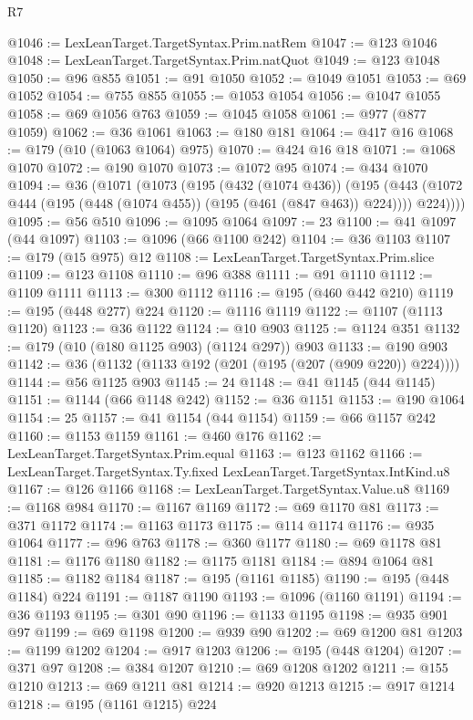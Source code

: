 \begin{lexlean}{R7}
\begin{coremodule}
@1046 := LexLeanTarget.TargetSyntax.Prim.natRem
@1047 := @123 @1046
@1048 := LexLeanTarget.TargetSyntax.Prim.natQuot
@1049 := @123 @1048
@1050 := @96 @855
@1051 := @91 @1050
@1052 := @1049 @1051
@1053 := @69 @1052
@1054 := @755 @855
@1055 := @1053 @1054
@1056 := @1047 @1055
@1058 := @69 @1056 @763
@1059 := @1045 @1058
@1061 := @977 (@877 @1059)
@1062 := @36 @1061
@1063 := @180 @181
@1064 := @417 @16
@1068 := @179 (@10 (@1063 @1064) @975)
@1070 := @424 @16 @18
@1071 := @1068 @1070
@1072 := @190 @1070
@1073 := @1072 @95
@1074 := @434 @1070
@1094 := @36
    (@1071
      (@1073
        (@195
          (@432 (@1074 @436))
          (@195
            (@443 (@1072 @444 (@195 (@448 (@1074 @455)) (@195 (@461 (@847 @463)) @224))))
            @224))))
@1095 := @56 @510
@1096 := @1095 @1064
@1097 := 23
@1100 := @41 @1097 (@44 @1097)
@1103 := @1096 (@66 @1100 @242)
@1104 := @36 @1103
@1107 := @179 (@15 @975) @12
@1108 := LexLeanTarget.TargetSyntax.Prim.slice
@1109 := @123 @1108
@1110 := @96 @388
@1111 := @91 @1110
@1112 := @1109 @1111
@1113 := @300 @1112
@1116 := @195 (@460 @442 @210)
@1119 := @195 (@448 @277) @224
@1120 := @1116 @1119
@1122 := @1107 (@1113 @1120)
@1123 := @36 @1122
@1124 := @10 @903
@1125 := @1124 @351
@1132 := @179 (@10 (@180 @1125 @903) (@1124 @297)) @903
@1133 := @190 @903
@1142 := @36 (@1132 (@1133 @192 (@201 (@195 (@207 (@909 @220)) @224))))
@1144 := @56 @1125 @903
@1145 := 24
@1148 := @41 @1145 (@44 @1145)
@1151 := @1144 (@66 @1148 @242)
@1152 := @36 @1151
@1153 := @190 @1064
@1154 := 25
@1157 := @41 @1154 (@44 @1154)
@1159 := @66 @1157 @242
@1160 := @1153 @1159
@1161 := @460 @176
@1162 := LexLeanTarget.TargetSyntax.Prim.equal
@1163 := @123 @1162
@1166 := LexLeanTarget.TargetSyntax.Ty.fixed LexLeanTarget.TargetSyntax.IntKind.u8
@1167 := @126 @1166
@1168 := LexLeanTarget.TargetSyntax.Value.u8
@1169 := @1168 @984
@1170 := @1167 @1169
@1172 := @69 @1170 @81
@1173 := @371 @1172
@1174 := @1163 @1173
@1175 := @114 @1174
@1176 := @935 @1064
@1177 := @96 @763
@1178 := @360 @1177
@1180 := @69 @1178 @81
@1181 := @1176 @1180
@1182 := @1175 @1181
@1184 := @894 @1064 @81
@1185 := @1182 @1184
@1187 := @195 (@1161 @1185)
@1190 := @195 (@448 @1184) @224
@1191 := @1187 @1190
@1193 := @1096 (@1160 @1191)
@1194 := @36 @1193
@1195 := @301 @90
@1196 := @1133 @1195
@1198 := @935 @901 @97
@1199 := @69 @1198
@1200 := @939 @90
@1202 := @69 @1200 @81
@1203 := @1199 @1202
@1204 := @917 @1203
@1206 := @195 (@448 @1204)
@1207 := @371 @97
@1208 := @384 @1207
@1210 := @69 @1208 @1202
@1211 := @155 @1210
@1213 := @69 @1211 @81
@1214 := @920 @1213
@1215 := @917 @1214
@1218 := @195 (@1161 @1215) @224

\end{coremodule}
\end{lexlean}
